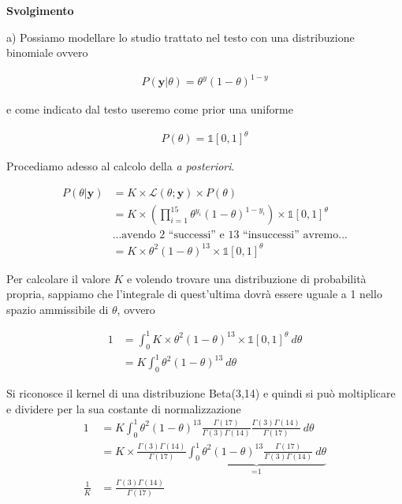 \textbf{Svolgimento}
\bigskip

a) Possiamo modellare lo studio trattato nel testo con una distribuzione binomiale ovvero

\begin{align*}
    P(\textbf{y}|\theta) = \theta^{y}(1-\theta)^{1-y}
\end{align*}

e come indicato dal testo useremo come prior una uniforme

\begin{align*}
    P(\theta)= \mathds{1}[0,1]^\theta
\end{align*}

Procediamo adesso al calcolo della \textit{a posteriori}.

\begin{align*}
    P(\theta|\textbf{y}) &= K  \times \mathcal{L}(\theta;\textbf{y})\times P(\theta)\\
    &= K \times \left(\prod_{i=1}^{15}\theta^{y_i}(1-\theta)^{1-y_i}\right)\times\mathds{1}[0,1]^\theta\\
    &\text{...avendo 2 ``successi'' e 13 ``insuccessi'' avremo...} \\
    &= K \times \theta^2(1-\theta)^{13} \times \mathds{1}[0,1]^\theta
\end{align*}

Per calcolare il valore $K$ e volendo trovare una distribuzione di probabilità propria, sappiamo che l'integrale di quest'ultima dovrà essere uguale a 1 nello spazio ammissibile di $\theta$, ovvero

\begin{align*}
   1 &= \int_0^1 K \times \theta^2(1-\theta)^{13} \times \mathds{1}[0,1]^\theta\ d\theta \\
    &= K \int_0^1  \theta^2(1-\theta)^{13}\ d\theta
\end{align*}

Si riconosce il kernel di una distribuzione Beta(3,14) e quindi si può moltiplicare e dividere per la sua costante di normalizzazione
\begin{align*}
    1 &= K \int_0^1  \theta^2(1-\theta)^{13} \frac{\Gamma(17)}{\Gamma(3)\Gamma(14)} \frac{\Gamma(3)\Gamma(14)}{\Gamma(17)}\ d\theta\\
    &= K \times \frac{\Gamma(3)\Gamma(14)}{\Gamma(17)} \underbrace{\int_0^1  \theta^2(1-\theta)^{13} \frac{\Gamma(17)}{\Gamma(3)\Gamma(14)}\ d\theta}_\text{=1}\\
    \frac{1}{K}&=\frac{\Gamma(3)\Gamma(14)}{\Gamma(17)}
\end{align*}

